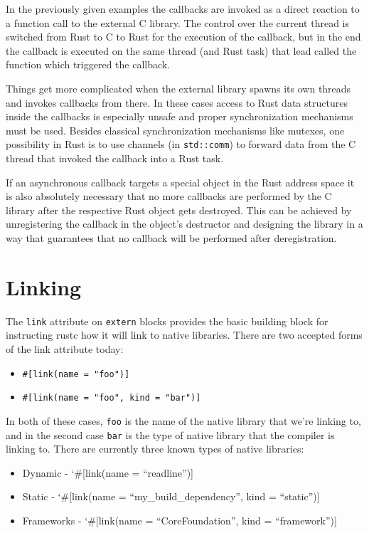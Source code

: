 \documentclass[]{article}
\begin{document}
In the previously given examples the callbacks are invoked as a direct
reaction to a function call to the external C library. The control over
the current thread is switched from Rust to C to Rust for the execution
of the callback, but in the end the callback is executed on the same
thread (and Rust task) that lead called the function which triggered the
callback.

Things get more complicated when the external library spawns its own
threads and invokes callbacks from there. In these cases access to Rust
data structures inside the callbacks is especially unsafe and proper
synchronization mechanisms must be used. Besides classical
synchronization mechanisms like mutexes, one possibility in Rust is to
use channels (in \texttt{std::comm}) to forward data from the C thread
that invoked the callback into a Rust task.

If an asynchronous callback targets a special object in the Rust address
space it is also absolutely necessary that no more callbacks are
performed by the C library after the respective Rust object gets
destroyed. This can be achieved by unregistering the callback in the
object's destructor and designing the library in a way that guarantees
that no callback will be performed after deregistration.

\section{Linking}\label{linking}

The \texttt{link} attribute on \texttt{extern} blocks provides the basic
building block for instructing rustc how it will link to native
libraries. There are two accepted forms of the link attribute today:

\begin{itemize}
\itemsep1pt\parskip0pt
\item
  \texttt{\#{[}link(name = "foo"){]}}
\item
  \texttt{\#{[}link(name = "foo", kind = "bar"){]}}
\end{itemize}

In both of these cases, \texttt{foo} is the name of the native library
that we're linking to, and in the second case \texttt{bar} is the type
of native library that the compiler is linking to. There are currently
three known types of native libraries:

\begin{itemize}
\itemsep1pt\parskip0pt
\item
  Dynamic - `\#{[}link(name = ``readline''){]}
\item
  Static - `\#{[}link(name = ``my\_build\_dependency'', kind =
  ``static''){]}
\item
  Frameworks - `\#{[}link(name = ``CoreFoundation'', kind =
  ``framework''){]}
\end{itemize}
\end{document}
